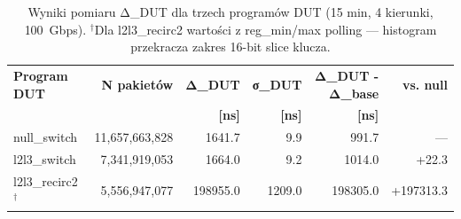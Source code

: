 \begin{table}[t]
\centering
\caption{Wyniki pomiaru Δ_DUT dla trzech programów DUT (15 min, 4 kierunki, 100~Gbps). $^\dagger$Dla l2l3\_recirc2 wartości z reg\_min/max polling — histogram przekracza zakres 16-bit slice klucza.}
\label{tab:dut_comparison}
\begin{tabular}{l r r r r r}
\toprule
\textbf{Program DUT} & \textbf{N pakietów} & \textbf{Δ\_DUT} & \textbf{σ\_DUT} & \textbf{Δ\_DUT - Δ\_base} & \textbf{vs. null} \\
& & \textbf{[ns]} & \textbf{[ns]} & \textbf{[ns]} & \\
\midrule
null\_switch & 11,657,663,828 & 1641.7 & 9.9 & 991.7 & — \\
l2l3\_switch & 7,341,919,053 & 1664.0 & 9.2 & 1014.0 & +22.3 \\
l2l3\_recirc2$^\dagger$ & 5,556,947,077 & 198955.0 & 1209.0 & 198305.0 & +197313.3 \\
\bottomrule
\end{tabular}
\end{table}
